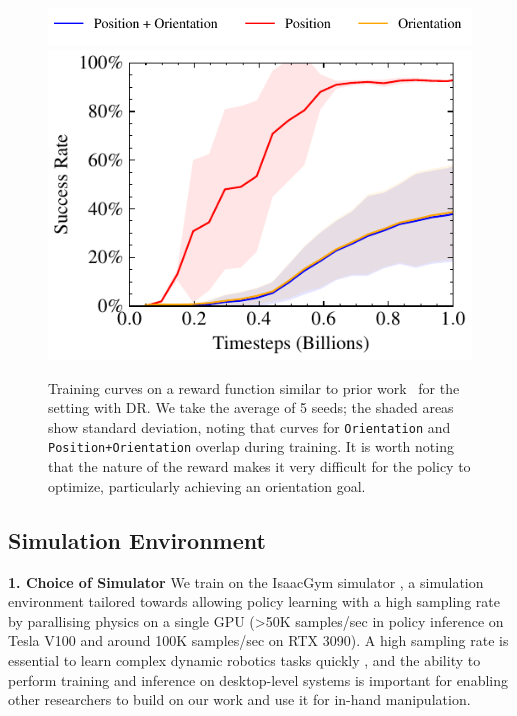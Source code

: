\documentclass[letterpaper, 10 pt, conference]{ieeeconf}  %
\begin{document}
\begin{figure}[!t]
\centering
\centering
  \includegraphics[width=\linewidth]{figure/exp1/pos_ori_legend.pdf}  
     \includegraphics[width=0.7\linewidth]{figure/exp1/pos_ori_total_success.pdf}  
    \caption{
              Training curves on a reward function similar to prior work~\cite{trifinger-benchmarking, rrc-submission-chen} for the setting with DR. We take the average of 5 seeds; the shaded areas show standard deviation, noting that curves for \texttt{Orientation} and \texttt{Position+Orientation} overlap during training. It is worth noting that the nature of the reward makes it very difficult for the policy to optimize, particularly achieving an orientation goal.
    }   \label{fig:exp1}
\end{figure}

\subsection{Simulation Environment}
\label{sec:environment}

\noindent \textbf{1. Choice of Simulator} We train on the IsaacGym simulator \citep{makoviychuk2021isaac}, a simulation environment tailored towards allowing policy learning with a high sampling rate by parallising physics on a single GPU (>50K samples/sec in policy inference on Tesla V100 and around 100K samples/sec on RTX 3090). A high sampling rate is essential to learn complex dynamic robotics tasks quickly \citep{makoviychuk2021isaac, brax2021github}, and the ability to perform training and inference on desktop-level systems is important for enabling other researchers to build on our work and use it for in-hand manipulation.
\end{document}
